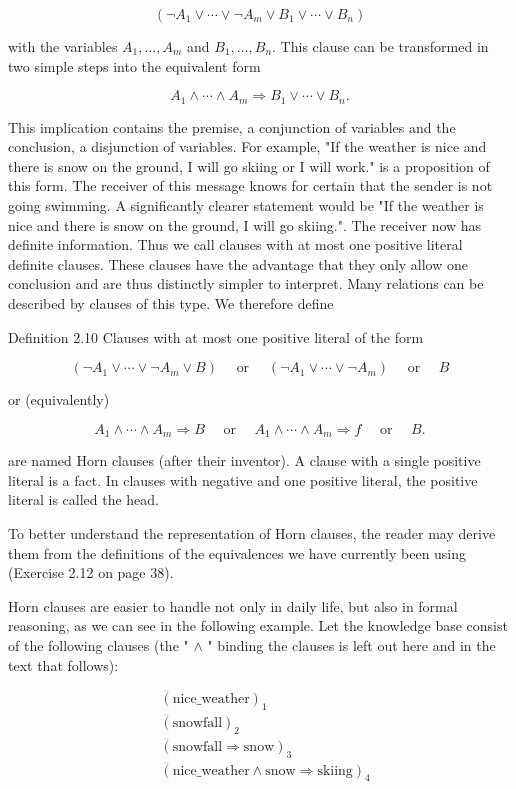 \documentclass[10pt]{book}
\begin{document}
$$
\left(\neg A_{1} \vee \cdots \vee \neg A_{m} \vee B_{1} \vee \cdots \vee B_{n}\right)
$$

with the variables $A_{1}, \ldots, A_{m}$ and $B_{1}, \ldots, B_{n}$. This clause can be transformed in two simple steps into the equivalent form

$$
A_{1} \wedge \cdots \wedge A_{m} \Rightarrow B_{1} \vee \cdots \vee B_{n} .
$$

This implication contains the premise, a conjunction of variables and the conclusion, a disjunction of variables. For example, "If the weather is nice and there is snow on the ground, I will go skiing or I will work." is a proposition of this form. The receiver of this message knows for certain that the sender is not going swimming. A significantly clearer statement would be "If the weather is nice and there is snow on the ground, I will go skiing.". The receiver now has definite information. Thus we call clauses with at most one positive literal definite clauses. These clauses have the advantage that they only allow one conclusion and are thus distinctly simpler to interpret. Many relations can be described by clauses of this type. We therefore define

Definition 2.10 Clauses with at most one positive literal of the form

$$
\left(\neg A_{1} \vee \cdots \vee \neg A_{m} \vee B\right) \quad \text { or } \quad\left(\neg A_{1} \vee \cdots \vee \neg A_{m}\right) \quad \text { or } \quad B
$$

or (equivalently)

$$
A_{1} \wedge \cdots \wedge A_{m} \Rightarrow B \quad \text { or } \quad A_{1} \wedge \cdots \wedge A_{m} \Rightarrow f \quad \text { or } \quad B .
$$

are named Horn clauses (after their inventor). A clause with a single positive literal is a fact. In clauses with negative and one positive literal, the positive literal is called the head.

To better understand the representation of Horn clauses, the reader may derive them from the definitions of the equivalences we have currently been using (Exercise 2.12 on page 38).

Horn clauses are easier to handle not only in daily life, but also in formal reasoning, as we can see in the following example. Let the knowledge base consist of the following clauses (the " $\wedge$ " binding the clauses is left out here and in the text that follows):

\[
\begin{aligned}
&(\text{nice\_weather})_{1}\\
&(\text{snowfall})_{2}\\
&(\text{snowfall} \Rightarrow \text{snow})_{3}\\
&(\text{nice\_weather} \wedge \text{snow} \Rightarrow \text{skiing})_{4}
\end{aligned}
\]
\end{document}
